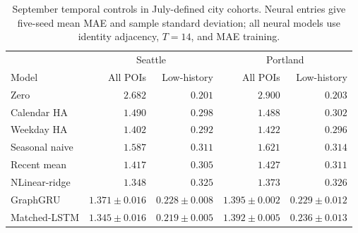 \begin{table}[!htbp]
\centering\small
\caption{September temporal controls in July-defined city cohorts. Neural entries give five-seed mean MAE and sample standard deviation; all neural models use identity adjacency, $T=14$, and MAE training.}
\label{tab:city_controls}
\begin{tabular}{lrrrr}
\toprule
 & \multicolumn{2}{c}{Seattle} & \multicolumn{2}{c}{Portland} \\
Model & All POIs & Low-history & All POIs & Low-history \\
\midrule
Zero & $2.682$ & $0.201$ & $2.900$ & $0.203$ \\
Calendar HA & $1.490$ & $0.298$ & $1.488$ & $0.302$ \\
Weekday HA & $1.402$ & $0.292$ & $1.422$ & $0.296$ \\
Seasonal naive & $1.587$ & $0.311$ & $1.621$ & $0.314$ \\
Recent mean & $1.417$ & $0.305$ & $1.427$ & $0.311$ \\
NLinear-ridge & $1.348$ & $0.325$ & $1.373$ & $0.326$ \\
GraphGRU & $1.371\pm 0.016$ & $0.228\pm 0.008$ & $1.395\pm 0.002$ & $0.229\pm 0.012$ \\
Matched-LSTM & $1.345\pm 0.016$ & $0.219\pm 0.005$ & $1.392\pm 0.005$ & $0.236\pm 0.013$ \\
\bottomrule
\end{tabular}
\end{table}
